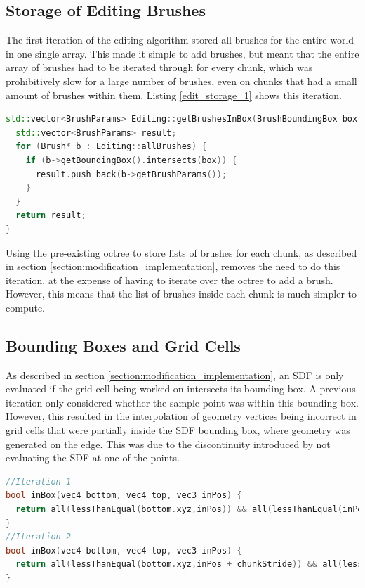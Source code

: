 \documentclass{article}
\begin{document}
\subsection{Storage of Editing Brushes}
The first iteration of the editing algorithm stored all brushes for the entire world in one single array. This made it simple to add brushes, but meant that the entire array of brushes had to be iterated through for every chunk, which was prohibitively slow for a large number of brushes, even on chunks that had a small amount of brushes within them. Listing \ref{edit_storage_1} shows this iteration.

\begin{lstlisting}[language=C++,label={edit_storage_1},caption={Iteration over every brush, returning those that intersect the bounding box of the chunk.}]
std::vector<BrushParams> Editing::getBrushesInBox(BrushBoundingBox box) {
  std::vector<BrushParams> result;
  for (Brush* b : Editing::allBrushes) {
    if (b->getBoundingBox().intersects(box)) {
      result.push_back(b->getBrushParams());
    }
  }
  return result;
}
\end{lstlisting}

Using the pre-existing octree to store lists of brushes for each chunk, as described in section \ref{section:modification_implementation}, removes the need to do this iteration, at the expense of having to iterate over the octree to add a brush. However, this means that the list of brushes inside each chunk is much simpler to compute.

\subsection{Bounding Boxes and Grid Cells}
As described in section \ref{section:modification_implementation}, an SDF is only evaluated if the grid cell being worked on intersects its bounding box. A previous iteration only considered whether the sample point was within this bounding box. However, this resulted in the interpolation of geometry vertices being incorrect in grid cells that were partially inside the SDF bounding box, where geometry was generated on the edge. This was due to the discontinuity introduced by not evaluating the SDF at one of the points. 

\begin{lstlisting}[language=C++,label={bb_gc},caption={The first iteration of the test of a grid cell point against an SDF bounding box defined by \texttt{bottom} and \texttt{top}, followed by the second iteration, which includes the value \texttt{chunkStride} to ensure that the SDF is considered if the sample point is within 1 grid cell of the bounding box.}]
//Iteration 1
bool inBox(vec4 bottom, vec4 top, vec3 inPos) {
  return all(lessThanEqual(bottom.xyz,inPos)) && all(lessThanEqual(inPos,top.xyz));
}
//Iteration 2
bool inBox(vec4 bottom, vec4 top, vec3 inPos) {
  return all(lessThanEqual(bottom.xyz,inPos + chunkStride)) && all(lessThanEqual(inPos - chunkStride,top.xyz));
}
\end{lstlisting}
\end{document}
